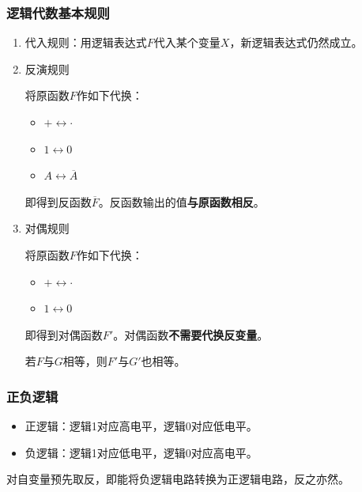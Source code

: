 \documentclass[UTF8,fontset=fandol,zihao=5]{ctexart}
\begin{document}
\subsubsection{逻辑代数基本规则}

    \begin{enumerate}
      \item 代入规则：用逻辑表达式$F$代入某个变量$X$，新逻辑表达式仍然成立。
      \item 反演规则

      将原函数$F$作如下代换：

      \begin{itemize}
        \item $ + \leftrightarrow \cdot $
        \item $ 1 \leftrightarrow 0 $
        \item $ A \leftrightarrow \overline{A} $
      \end{itemize}

      即得到反函数$\overline{F}$。反函数输出的值\textbf{与原函数相反}。

      \item 对偶规则

      将原函数$F$作如下代换：

      \begin{itemize}
        \item $ + \leftrightarrow \cdot $
        \item $ 1 \leftrightarrow 0 $
      \end{itemize}

      即得到对偶函数$F'$。对偶函数\textbf{不需要代换反变量}。

      若$F$与$G$相等，则$F'$与$G'$也相等。

    \end{enumerate}

\subsubsection{正负逻辑}

    \begin{itemize}
      \item 正逻辑：逻辑1对应高电平，逻辑0对应低电平。
      \item 负逻辑：逻辑1对应低电平，逻辑0对应高电平。
    \end{itemize}

    \begin{methodbox}[正负逻辑转换]
      对自变量预先取反，即能将负逻辑电路转换为正逻辑电路，反之亦然。
    \end{methodbox}
\end{document}
